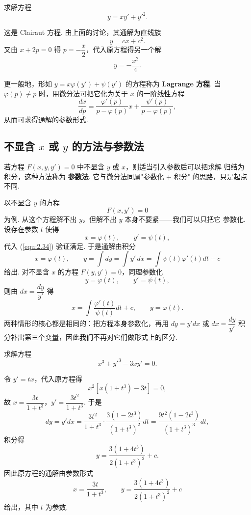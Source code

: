 \begin{eg}
求解方程
\[
y=xy'+y'^2.
\]
\begin{pf2}
这是 Clairaut 方程. 由上面的讨论，其通解为直线族
\[
y=cx+c^2.
\]
又由 $x+2p=0$ 得 $p=-\dfrac{x}{2}$，代入原方程得另一个解
\[
y=-\frac{x^2}{4}.
\]
\end{pf2}
\end{eg}

\begin{rmk}
更一般地，形如 $y=x\varphi(y')+\psi(y')$ 的方程称为 \textbf{Lagrange 方程}.
当 $\varphi(p)\not\equiv p$ 时，用微分法可把它化为关于 $x$ 的一阶线性方程
\[
\frac{dx}{dp}=\frac{\varphi'(p)}{p-\varphi(p)}x+\frac{\psi'(p)}{p-\varphi(p)},
\]
从而可求得通解的参数形式.
\end{rmk}

\subsection{不显含 $x$ 或 $y$ 的方法与参数法}
若方程 $F(x,y,y')=0$ 中不显含 $y$ 或 $x$，则适当引入参数后可以把求解
归结为积分，这种方法称为 \textbf{参数法}. 它与微分法同属"参数化 + 积分"
的思路，只是起点不同.

以不显含 $y$ 的方程
\begin{equation}\label{equ:2.34}
F(x,y')=0
\end{equation}
为例. 从这个方程解不出 $y$，但解不出 $y$ 本身不要紧——我们可以只把它
参数化. 设存在参数 $t$ 使得
\[
x=\varphi(t),\qquad y'=\psi(t),
\]
代入 (\ref{equ:2.34}) 验证满足. 于是通解由积分
\[
x=\varphi(t),\qquad
y=\int dy=\int y'\,dx
=\int\psi(t)\varphi'(t)dt+c
\]
给出. 对不显含 $x$ 的方程 $F(y,y')=0$，同理参数化
\[
y=\varphi(t),\qquad y'=\psi(t),
\]
则由 $dx=\dfrac{dy}{y'}$ 得
\[
x=\int\frac{\varphi'(t)}{\psi(t)}dt+c,\qquad y=\varphi(t).
\]
两种情形的核心都是相同的：把方程本身参数化，再用 $dy=y'dx$ 或
$dx=\dfrac{dy}{y'}$ 积分补出第三个变量，因此我们不再对它们做形式上的区分.

\begin{eg}
求解方程
\[
x^3+y'^3-3xy'=0.
\]
\begin{pf2}
令 $y'=tx$，代入原方程得
\[
x^2\left[x(1+t^3)-3t\right]=0,
\]
故 $x=\dfrac{3t}{1+t^3}$，$y'=\dfrac{3t^2}{1+t^3}$. 于是
\[
dy=y'dx=\frac{3t^2}{1+t^3}\cdot\frac{3(1-2t^3)}{(1+t^3)^2}dt
=\frac{9t^2(1-2t^3)}{(1+t^3)^3}dt,
\]
积分得
\[
y=\frac{3(1+4t^3)}{2(1+t^3)^2}+c.
\]
因此原方程的通解由参数形式
\[
x=\frac{3t}{1+t^3},\qquad y=\frac{3(1+4t^3)}{2(1+t^3)^2}+c
\]
给出，其中 $t$ 为参数.
\end{pf2}
\end{eg}

